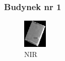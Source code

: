 \documentclass[a4paper,12pt]{article}  %
\begin{document}
\subsubsection{Budynek nr 1}
\begin{figure}[H]
    \centering
    \begin{minipage}{0.24\textwidth}
        \centering
        \includegraphics[width=\linewidth]{spektralne/nir_budynek0.png}
        \caption*{NIR}
    \end{minipage}
    \begin{minipage}{0.24\textwidth}
        \centering

\end{minipage}
\end{figure}
\end{document}
